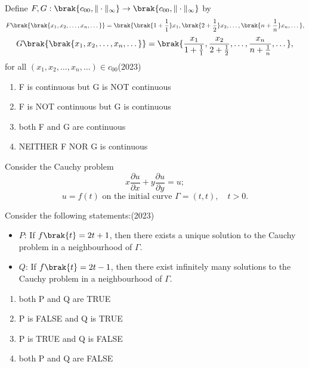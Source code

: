 Define $F, G : \brak{c_{00}, \|\cdot\|_{\infty}} \to \brak{c_{00}, \|\cdot\|_{\infty}} $ by
$$
F\brak{\brak{x_1, x_2, \dots, x_n, \dots}} = \brak{ \brak{1 + \frac{1}{1}}x_1, \brak{2 + \frac{1}{2}}x_2, \dots, \brak{n + \frac{1}{n}}x_n, \dots},
$$
$$
G\brak{\brak{x_1, x_2, \dots, x_n, \dots}} = \brak{ \frac{x_1}{1 + \frac{1}{1}}, \frac{x_2}{2 + \frac{1}{2}}, \dots, \frac{x_n}{n + \frac{1}{n}}, \dots },
$$
for all $(x_1, x_2, \dots, x_n, \dots) \in c_{00}$\hfill (2023)
\begin{enumerate}[label=(\Alph*)]
    \item F is continuous but G is NOT continuous
    \item F is NOT continuous but G is continuous
    \item both F and G are continuous 
    \item NEITHER F NOR G is continuous 
\end{enumerate}
\item Consider the Cauchy problem
$$
x \frac{\partial u}{\partial x} + y \frac{\partial u}{\partial y} = u;
$$
$$
u = f(t) \text{ on the initial curve } \Gamma = (t, t), \quad t > 0.
$$

Consider the following statements:\hfill (2023)

\begin{itemize}
    \item $ P $: If $ f\brak{t} = 2t + 1 $, then there exists a unique solution to the Cauchy problem in a neighbourhood of \( \Gamma \).
    \item $ Q $: If $ f\brak{t} = 2t - 1 $, then there exist infinitely many solutions to the Cauchy problem in a neighbourhood of \( \Gamma \).
\end{itemize}
\begin{enumerate}[label=(\Alph*)]
    \item both P and Q are TRUE
    \item P is FALSE and Q is TRUE
    \item P is TRUE and Q is FALSE
    \item both P and Q are FALSE

\end{enumerate}

 
